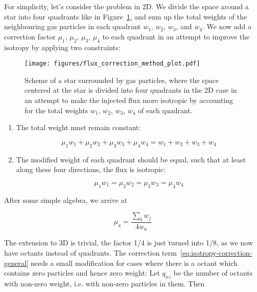 For simplicity, let's consider the problem in 2D. We divide the space around a star into four  
quadrants like in Figure~\ref{fig:flux-injection-correction-method}, and sum up the total weights 
of the neighbouring gas particles in each quadrant $w_1$, $w_2$, $w_3$, and $w_4$. We now add a 
correction factor $\mu_1$,  $\mu_2$,  $\mu_3$,  $\mu_4$ to each quadrant in an attempt to improve 
the isotropy by applying two constraints:

\begin{figure}
	\centering
	\texttt{[image: figures/flux\_correction\_method\_plot.pdf]}%
	\label{fig:flux-injection-correction-method}
	\caption{
		Scheme of a star surrounded by gas particles, where the space centered at the
        star is divided into four quadrants in the 2D case in an attempt to make the
        injected flux more isotropic by accounting for the total weights $w_1$, $w_2$,
        $w_3$, $w_4$ of each quadrant.
	}
\end{figure}

\begin{enumerate}
    \item The total weight must remain constant:
    
\begin{equation}
\mu_1 w_1 + \mu_2 w_2 + \mu_3 w_3 + \mu_4 w_4 = w_1 + w_2 + w_3 + w_4
\end{equation}

    \item The modified weight of each quadrant should be equal, such that at least along these four 
    directions, the flux is isotropic:
    
\begin{equation}
\mu_1 w_1 = \mu_2 w_2 = \mu_3 w_3 = \mu_4 w_4
\end{equation}

\end{enumerate}

After some simple algebra, we arrive at

\begin{equation}
\mu_a = \frac{\sum_b w_j}{4 w_a} \label{eq:isotropy-correction-general}
\end{equation}

The extension to 3D is trivial, the factor 1/4 is just turned into 1/8, as we now have octants 
instead of quadrants. The correction term~\ref{eq:isotropy-correction-general} needs a small 
modification for cases where there is a octant which contains zero particles and hence zero 
weight: Let $q_{nz}$ be the number of octants with non-zero weight, i.e. with non-zero particles 
in them. Then

